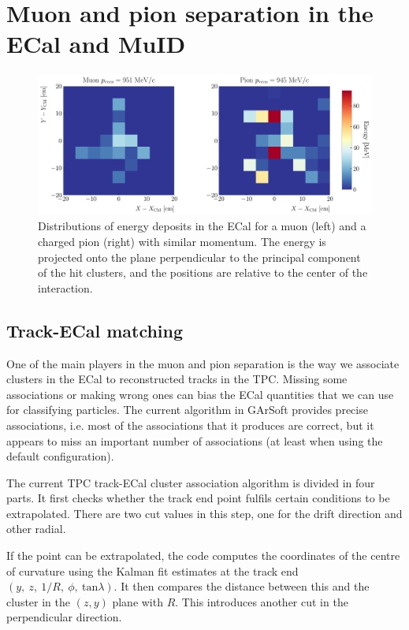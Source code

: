 \section{Muon and pion separation in the ECal and MuID}

\begin{figure}[t]
	\centering
	\includegraphics[width=.95\linewidth]{Images/GArSoft_PID/BDT/ecal_energy_distribution_example.pdf}
	\caption{Distributions of energy deposits in the ECal for a muon (left) and a charged pion (right) with similar momentum. The energy is projected onto the plane perpendicular to the principal component of the hit clusters, and the positions are relative to the center of the interaction.}
	\label{fig:ecal_example}
\end{figure}

\subsection{Track-ECal matching}

One of the main players in the muon and pion separation is the way we associate clusters in the ECal to reconstructed tracks in the TPC. Missing some associations or making wrong ones can bias the ECal quantities that we can use for classifying particles. The current algorithm in GArSoft provides precise associations, i.e. most of the associations that it produces are correct, but it appears to miss an important number of associations (at least when using the default configuration).

The current TPC track-ECal cluster association algorithm is divided in four parts. It first checks whether the track end point fulfils certain conditions to be extrapolated. There are two cut values in this step, one for the drift direction and other radial.

If the point can be extrapolated, the code computes the coordinates of the centre of curvature using the Kalman fit estimates at the track end $(y, \ z, \ 1/R, \ \phi, \ \mathrm{tan}\lambda)$. It then compares the distance between this and the cluster in the $(z,y)$ plane with $R$. This introduces another cut in the perpendicular direction.

